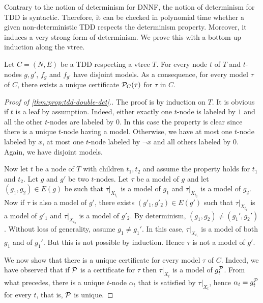 \documentclass[a4paper,UKenglish,cleveref, autoref, thm-restate]{lipics-v2021}
\newcommand{\guy}[1]{\todo[color=purple]{\color{white}{{\bf Guy}: #1}}}
\begin{document}
Contrary to the notion of determinism for DNNF, the notion of determinism for TDD is syntactic. Therefore, it can be checked in polynomial time whether a given non-deterministic TDD respects the determinism property. Moreover, it induces a very strong form of determinism. We prove this with a bottom-up induction along the vtree.
\begin{theorem}[$\star$]
  \label{thm:prop:tdd-double-det}
  Let $C=(N,E)$ be a TDD respecting a vtree $T$. For every node $t$ of $T$ and $t$-nodes $g,g'$, $f_g$ and $f_{g'}$ have disjoint models. As a consequence, for every model $\tau$ of $C$, there exists a unique certificate $\mathcal{P}_C(\tau)$ for $\tau$ in $C$. 
\end{theorem}
\begin{toappendix}
\begin{proof}[Proof of \cref{thm:prop:tdd-double-det}.]
  The proof is by induction on $T$. It is obvious if $t$ is a leaf by assumption. Indeed, either exactly one $t$-node is labeled by $1$ and all the other $t$-nodes are labeled by $0$. In this case the property is clear since there is a unique $t$-node having a model. Otherwise, we have at most one $t$-node labeled by $x$, at most one $t$-node labeled by $\neg x$ and all others labeled by $0$. Again, we have disjoint models.
  
  Now let $t$ be a node of $T$ with children $t_1,t_2$ and assume the property holds for $t_1$ and $t_2$. Let $g$ and $g'$ be two $t$-nodes. Let $\tau$ be a model of $g$ and let $(g_1,g_2) \in E(g)$ be such that $\tau|_{X_{t_1}}$ is a model of $g_1$ and $\tau|_{X_{t_2}}$ is a model of $g_2$. Now if $\tau$ is also a model of $g'$, there exists $(g'_1,g'_2) \in E(g')$
  such that $\tau|_{X_{t_1}}$ is a model of $g'_1$ and $\tau|_{X_{t_2}}$ is a model of $g'_2$. By determinism, $(g_1,g_2) \neq (g_1',g_2')$. Without loss of generality, assume $g_1 \neq g_1'$. In this case, $\tau|_{X_{t_1}}$ is a model of both $g_1$ and of $g_1'$. But this is not possible by induction. Hence $\tau$ is not a model of $g'$.

    We now show that there is a unique certificate for every model $\tau$ of $C$. Indeed, we have observed that if $\mathcal{P}$ is a certificate for $\tau$ then $\tau|_{X_t}$ is a model of $g_t^{\mathcal{P}}$. From what precedes, there is a unique $t$-node $\alpha_t$ that is satisfied by $\tau|_{X_t}$, hence $\alpha_t = g_t^{\mathcal{P}}$ for every $t$, that is, $\mathcal{P}$ is unique.
\end{proof}
\end{toappendix}
\end{document}
